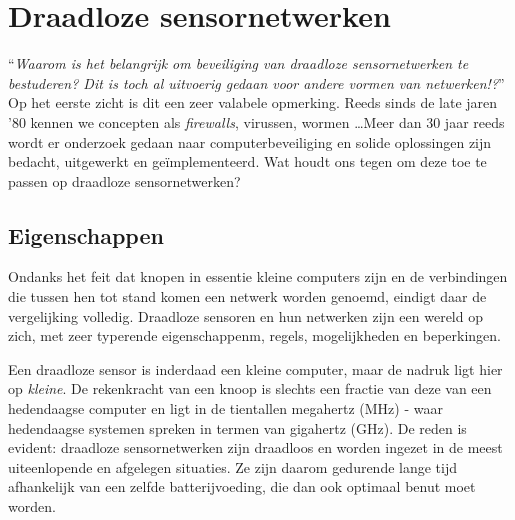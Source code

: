 
\section{Draadloze sensornetwerken}
\label{section:landscape}

``\emph{Waarom is het belangrijk om beveiliging van draadloze sensornetwerken
te bestuderen? Dit is toch al uitvoerig gedaan voor andere vormen van
netwerken!?}'' Op het eerste zicht is dit een zeer valabele opmerking. Reeds
sinds de late jaren '80 kennen we concepten als \emph{firewalls}, virussen,
wormen \dots Meer dan 30 jaar reeds wordt er onderzoek gedaan naar
computerbeveiliging en solide oplossingen zijn bedacht, uitgewerkt en
ge\"implementeerd. Wat houdt ons tegen om deze toe te passen op draadloze
sensornetwerken?

\subsection{Eigenschappen}

Ondanks het feit dat knopen in essentie kleine computers zijn en de
verbindingen die tussen hen tot stand komen een netwerk worden genoemd, eindigt
daar de vergelijking volledig. Draadloze sensoren en hun netwerken zijn een
wereld op zich, met zeer typerende eigenschappenm, regels, mogelijkheden en
beperkingen.

Een draadloze sensor is inderdaad een kleine computer, maar de nadruk ligt hier
op \emph{kleine}. De rekenkracht van een knoop is slechts een fractie van deze
van een hedendaagse computer en ligt in de tientallen megahertz (MHz) - waar
hedendaagse systemen spreken in termen van gigahertz (GHz). De reden is
evident: draadloze sensornetwerken zijn draadloos en worden ingezet in de meest
uiteenlopende en afgelegen situaties. Ze zijn daarom gedurende lange tijd
afhankelijk van een zelfde batterijvoeding, die dan ook optimaal benut moet
worden.

